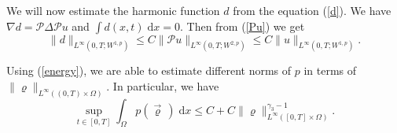 \documentclass[11pt]{article}
\newcommand{\dd}{\mathrm{d}}
\newcommand{\ddiv}{\mathrm{div\,}}
\renewcommand{\div}{\mathrm{div}}
\newcommand{\cP}{\mathcal{P}}
\newtheorem{lem}[tw]{Lemma}
\numberwithin{equation}{section}
\numberwithin{tw}{section}
\begin{document}
%
We will now estimate the harmonic function $d$ from the equation (\ref{d}). We have $\nabla d =\cP \Delta \cP u$ and $\int d(x,t) \;\dd x=0$. Then from (\ref{Pu}) we get
\begin{equation}\label{d_est} \|d\|_{L^\infty(0,T;W^{1,p})}\leq C\|\mathcal{P}u\|_{L^\infty(0,T;W^{2,p})} \leq C\|u\|_{L^\infty(0,T;W^{1,p})}. \end{equation}



 
 


 
 
Using (\ref{energy}), we are able to estimate different norms of $p$ in terms of $\|\varrho\|_{L^\infty((0,T)\times\Omega)}$. In particular, we have
 \begin{equation}\label{p_int} \sup_{t\in[0,T]}\int_\Omega p(\vec\varrho\,)\;\dd x \leq C + C\|\varrho\|_{L^\infty([0,T]\times\Omega)}^{\gamma_3-1}. \end{equation}
 
\end{document}
